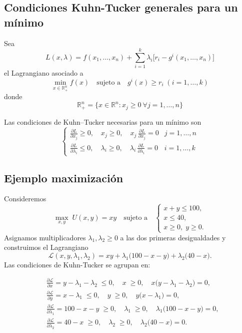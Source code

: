 \documentclass{article}
\begin{document}
\subsection*{Condiciones Kuhn-Tucker generales para un mínimo}

Sea  
\[
L(x,\lambda)
= f(x_1,\dots,x_n)
+ \sum_{i=1}^{k}\lambda_i\bigl[r_i - g^i(x_1,\dots,x_n)\bigr]
\]
el Lagrangiano asociado a  
\[
\min_{x\in\mathbb R^n_+}f(x)
\quad\text{sujeto a}\quad
g^i(x)\ge r_i\;(i=1,\dots,k)
\]
donde  
\[
\mathbb R^n_+ = \{x\in\mathbb R^n : x_j\ge0\ \forall j=1,\dots,n\}
\]

Las condiciones de Kuhn–Tucker necesarias para un mínimo son  
\[
\begin{cases}
\displaystyle
\frac{\partial L}{\partial x_j}\ge0,\quad
x_j\ge0,\quad
x_j\,\frac{\partial L}{\partial x_j}=0
& j=1,\dots,n\\[8pt]
\displaystyle
\frac{\partial L}{\partial \lambda_i}\le0,\quad
\lambda_i\ge0,\quad
\lambda_i\,\frac{\partial L}{\partial \lambda_i}=0
& i=1,\dots,k
\end{cases}
\]



\subsection*{Ejemplo maximización}


Consideremos
\[
\max_{x,y}\;U(x,y)=xy
\quad\text{sujeto a}\quad
\begin{cases}
x+y\le100,\\
x\le40,\\
x\ge0,\;y\ge0.
\end{cases}
\]
Asignamos multiplicadores \(\lambda_1,\lambda_2\ge0\) a las dos primeras desigualdades y construimos el Lagrangiano
\[
\mathcal L(x,y,\lambda_1,\lambda_2)
=xy
+\lambda_1\bigl(100 - x - y\bigr)
+\lambda_2\bigl(40 - x\bigr).
\]
Las condiciones de Kuhn-Tucker se agrupan en:

\[
\begin{aligned}
&\frac{\partial\mathcal L}{\partial x}
=y-\lambda_1-\lambda_2\;\le0,\quad
x\;\ge0,\quad
x\bigl(y-\lambda_1-\lambda_2\bigr)=0,\\
&\frac{\partial\mathcal L}{\partial y}
=x-\lambda_1\;\le0,\quad
y\;\ge0,\quad
y\bigl(x-\lambda_1\bigr)=0,\\
&\frac{\partial\mathcal L}{\partial\lambda_1}
=100 - x - y\;\ge0,\quad
\lambda_1\;\ge0,\quad
\lambda_1\bigl(100 - x - y\bigr)=0,\\
&\frac{\partial\mathcal L}{\partial\lambda_2}
=40 - x\;\ge0,\quad
\lambda_2\;\ge0,\quad
\lambda_2\bigl(40 - x\bigr)=0.
\end{aligned}
\]
\end{document}
